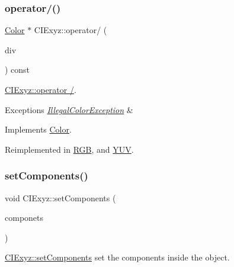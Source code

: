\mbox{\label{class_c_i_exyz_abb3f5e1c8a923d7758e6bbe83b71f4fa}} 
\subsubsection{\texorpdfstring{operator/()}{operator/()}}
{\footnotesize\ttfamily \hyperlink{class_color}{Color} $\ast$ C\+I\+Exyz\+::operator/ (\begin{DoxyParamCaption}\item[{const int \&}]{div }\end{DoxyParamCaption}) const\hspace{0.3cm}{\ttfamily [virtual]}}



\hyperlink{class_c_i_exyz_abb3f5e1c8a923d7758e6bbe83b71f4fa}{C\+I\+Exyz\+::operator /}. 


\begin{DoxyExceptions}{Exceptions}
{\em \hyperlink{class_illegal_color_exception}{Illegal\+Color\+Exception}} & \\
\hline
\end{DoxyExceptions}


Implements \hyperlink{class_color}{Color}.



Reimplemented in \hyperlink{class_r_g_b_a9d250e0f58e7ae7d4c69ced724da6f80}{R\+GB}, and \hyperlink{class_y_u_v_a1b9300c00323eca16fc4bb028964e85f}{Y\+UV}.

\mbox{\label{class_c_i_exyz_a11468574f91d2cb1356f0cde56429b84}} 
\subsubsection{\texorpdfstring{set\+Components()}{setComponents()}}
{\footnotesize\ttfamily void C\+I\+Exyz\+::set\+Components (\begin{DoxyParamCaption}\item[{Q\+Vector$<$ double $>$}]{componets }\end{DoxyParamCaption})\hspace{0.3cm}{\ttfamily [virtual]}}



\hyperlink{class_c_i_exyz_a11468574f91d2cb1356f0cde56429b84}{C\+I\+Exyz\+::set\+Components} set the components inside the object. 


